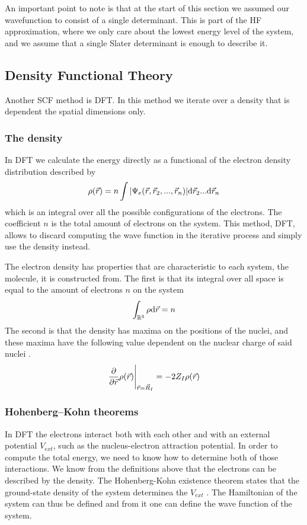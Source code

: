 \documentclass[../master_thesis.tex]{subfiles}
\begin{document}
An important point to note is that at the start of this section we assumed our
wavefunction to consist of a single determinant. This is part of the \ac{HF}
approximation, where we only care about the lowest energy level of the system, and
we assume that a single Slater determinant is enough to describe it.

\subsection{Density Functional Theory}
Another \ac{SCF} method is \ac{DFT}. In this method we iterate over
a density that is dependent the spatial dimensions only.
\subsubsection{The density}
In \ac{DFT} we calculate the energy directly as a functional
of the electron density distribution \cite{Sorland, Cramer:2004} described by
\begin{equation}\label{eq:densityintegral}
  \rho(\vec{r}) = n \int\abs{\Psi_e(\vec{r}, \vec{r}_2,..., \vec{r}_n)} \text{d}\vec{r}_2...\text{d}\vec{r}_n
\end{equation}
which is an integral over all the possible configurations of the electrons. The
coefficient $n$ is the total amount of electrons on the system. This method,
\ac{DFT}, allows to discard computing the wave function in the iterative process and
simply use the density instead.

The electron density has properties that are characteristic to each system, the
molecule,  it is constructed from. The first is that its integral over all space
is equal to the amount of electrons $n$ on the system \cite{Cramer:2004}
\begin{equation}
  \int_{\mathbb{R}^3}\rho \text{d}\vec{r} = n
\end{equation}
The second is that the density has maxima on the positions of the nuclei, and
these maxima have the following value dependent on the nuclear charge of said
nuclei \cite{Cramer:2004}.
\begin{equation}
 \frac{\partial}{\partial \vec{r}}\rho(\vec{r})\Bigg|_{\vec{r} = \vec{R}_I} = -2Z_I\rho(\vec{r})
\end{equation}
\subsubsection{Hohenberg--Kohn theorems}
In \ac{DFT} the electrons interact both with each other and with an external
potential $V_{ext}$, such as the nucleus-electron attraction potential. In order to
compute the total energy, we need to know how to determine both of those interactions.
We know from the definitions above that the electrons can be described by the density.
The Hohenberg-Kohn existence theorem states that the ground-state density of the system
determinea the $V_{ext}$ \cite{Cramer:2004}. The Hamiltonian of the system can thus be defined and
from it one can define the wave function of the system.
\end{document}
